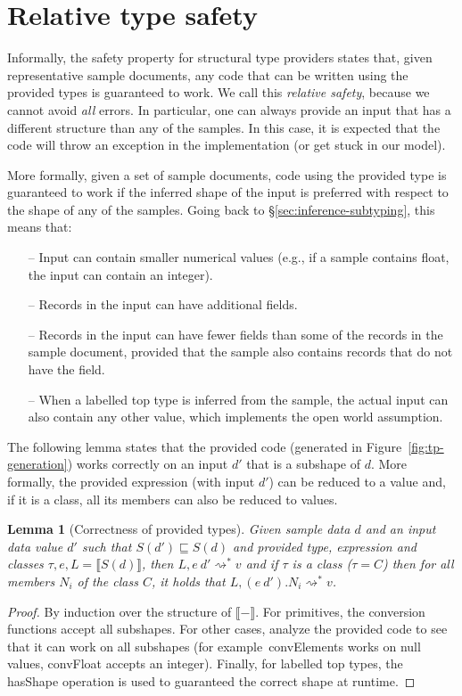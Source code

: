 \documentclass[10pt]{sigplanconf}
\newcommand{\kvd}[1]{\textnormal{\textcolor{kvdclr}{\sffamily #1}}}
\newcommand{\ident}[1]{\textnormal{\sffamily #1}}
\newcommand{\reduce}{\rightsquigarrow}
\newcommand{\sem}[1]{\llbracket #1 \rrbracket}
\newcommand{\semalt}[1]{S(#1)}
\newtheorem{lemma}[theorem]{Lemma}
\begin{document}
\section{Relative type safety}
\label{sec:safety}

Informally, the safety property for structural type providers states that, given representative sample
documents, any code that can be written using the provided types is guaranteed to work. We call this
\emph{relative safety}, because we cannot avoid \emph{all} errors. In particular, one can always
provide an input that has a different structure than any of the samples. In this case, it is expected
that the code will throw an exception in the implementation (or get stuck in our model).

More formally, given a set of sample documents, code using the provided type is guaranteed to work if
the inferred shape of the input is preferred with respect to the shape of any of the samples. Going back to
\S\ref{sec:inference-subtyping}, this means that:
%
\begin{itemize}
\item[--] Input can contain smaller numerical values (e.g., if a sample contains float, the input can contain an integer).
\item[--] Records in the input can have additional fields.
\item[--] Records in the input can have fewer fields than some of the records in the sample
  document, provided that the sample also contains records that do not have the field.
\item[--] When a labelled top type is inferred from the sample, the actual input can also contain any other value,
  which implements the open world assumption.
\end{itemize}
%
The following lemma states that the provided code (generated in Figure~\ref{fig:tp-generation})
works correctly on an input $d'$ that is a subshape of $d$. More formally, the provided
expression (with input $d'$) can be reduced to a value and, if it is a class,
all its members can also be reduced to values.

\begin{lemma}[Correctness of provided types]
\label{thm:tp-correctness}
Given sample data $d$ and an input data value $d'$ such that $\semalt{d'} \sqsubseteq \semalt{d}$
and provided type, expression and classes $\tau, e, L = \sem{\semalt{d}}$,
then $L, e~d' \reduce^{*} v$ and if $\tau$ is a class ($\tau=C$) then for all members $N_i$ of the
class $C$, it holds that $L, (e~d').N_i \reduce^{*} v$.
\end{lemma}
\begin{proof}
By induction over the structure of $\sem{-}$. For primitives, the conversion functions accept all subshapes.
For other cases, analyze the provided code to see that it can work on all subshapes (for example~\ident{convElements}
works on \kvd{null} values, \ident{convFloat} accepts an integer). Finally, for labelled top types,
the \ident{hasShape} operation is used to guaranteed the correct shape at runtime.
\end{proof}
\end{document}
